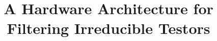 \documentclass[conference]{IEEEtran}
\begin{document}
%
\title{A Hardware Architecture for Filtering Irreducible Testors}




% 
\end{document}
